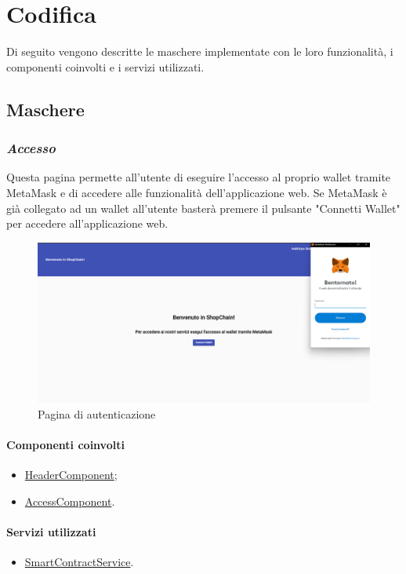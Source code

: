 \section{Codifica}
Di seguito vengono descritte le maschere implementate con le loro funzionalità, i componenti coinvolti e i servizi utilizzati.
\subsection{Maschere}

\subsubsection*{\textit{Accesso}}
Questa pagina permette all'utente di eseguire l'accesso al proprio wallet tramite MetaMask e di accedere alle funzionalità dell'applicazione web. Se MetaMask è già collegato ad un wallet all'utente basterà premere il pulsante "Connetti Wallet" per accedere all'applicazione web.

\begin{figure}[!h] 
    \centering 
    \includegraphics[width=1\columnwidth]{immagini/maschere/autenticazione.png} 
    \caption{Pagina di autenticazione}
\end{figure}

\paragraph{Componenti coinvolti}
\begin{itemize}
    \item \hyperref[sec:header-component]{HeaderComponent};
    \item \hyperref[sec:access-component]{AccessComponent}.
\end{itemize}

\paragraph{Servizi utilizzati}
\begin{itemize}
    \item \hyperref[sec:smart-contract-service]{SmartContractService}.
\end{itemize}

